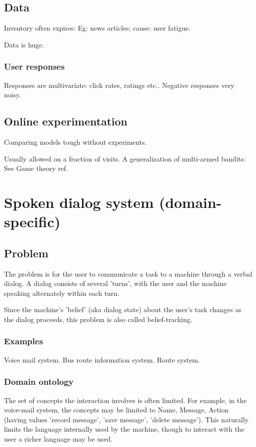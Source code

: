 \documentclass[oneside, article]{memoir}
\begin{document}
\section{Data}
Inventory often expires: Eg: news articles; cause: user fatigue.

Data is huge.

\subsection{User responses}
Responses are multivariate: click rates, ratings etc.. Negative responses very noisy.

\section{Online experimentation}
Comparing models tough without experiments.

Usually allowed on a fraction of visits. A generalization of multi-armed bandits: See Game theory ref.

\chapter{Spoken dialog system (domain-specific)}
\section{Problem}
The problem is for the user to communicate a task to a machine through a verbal dialog. A dialog consists of several 'turns', with the user and the machine speaking alternately within each turn.

Since the machine's 'belief' (aka dialog state) about the user's task changes as the dialog proceeds, this problem is also called belief-tracking.

\subsection{Examples}
Voice mail system. Bus route information system. Route system.

\subsection{Domain ontology}
The set of concepts the interaction involves is often limited. For example, in the voice-mail system, the concepts may be limited to Name, Message, Action (having values 'record message', 'save message', 'delete message'). This naturally limits the language internally used by the machine, though to interact with the user a richer language may be used.
\end{document}
